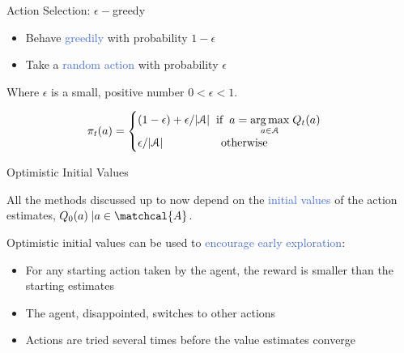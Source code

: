 \documentclass{beamer}
\DeclareMathOperator*{\argmax}{arg\,max}
\begin{document}
\begin{frame}{Action Selection: $\epsilon-$greedy}



\begin{itemize}
    \item Behave \textcolor{RoyalBlue}{greedily} with probability $1-\epsilon$
    \item Take a \textcolor{RoyalBlue}{random action} with probability $\epsilon$
\end{itemize}

\vspace{2mm}

Where $\epsilon$ is a small, positive number $0 < \epsilon < 1$.

\begin{align*}
 \pi_t(a) =
    \begin{cases}
      (1-\epsilon) + \epsilon/|\mathcal{A}| \hspace{2mm} \text{if} \hspace{2mm} a=\underset{a \in \mathcal{A}}{\argmax} \; Q_t(a)\\
       \epsilon/|\mathcal{A}|  \hspace{18mm} \text{otherwise}
    \end{cases}       
\end{align*}


\end{frame}




\begin{frame}{Optimistic Initial Values}

All the methods discussed up to now depend on the \textcolor{RoyalBlue}{initial values} of the action estimates,  $Q_0(a) \; | a \in \matchcal{A}$.

\vspace{5mm}

Optimistic initial values can be used to \textcolor{RoyalBlue}{encourage early exploration}:

\vspace{1mm}
\begin{itemize}
    \item For any starting action taken by the agent, the reward is smaller than the starting estimates
    \item The agent, disappointed, switches to other actions
    \item Actions are tried several times before the value estimates converge
\end{itemize}
\end{frame}
\end{document}
